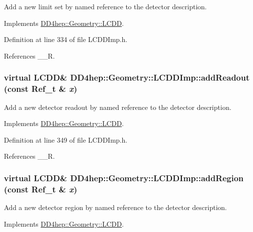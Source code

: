 Add a new limit set by named reference to the detector description. 

Implements \hyperlink{class_d_d4hep_1_1_geometry_1_1_l_c_d_d_af11d7a6aaeb91256f14d5892d84e2b30}{DD4hep::Geometry::LCDD}.

Definition at line 334 of file LCDDImp.h.

References \_\-\_\-R.\hypertarget{class_d_d4hep_1_1_geometry_1_1_l_c_d_d_imp_a876f792d25fd05a99646cd6c0df77d09}{
\subsubsection[{addReadout}]{\setlength{\rightskip}{0pt plus 5cm}virtual {\bf LCDD}\& DD4hep::Geometry::LCDDImp::addReadout (const {\bf Ref\_\-t} \& {\em x})}}
\label{class_d_d4hep_1_1_geometry_1_1_l_c_d_d_imp_a876f792d25fd05a99646cd6c0df77d09}


Add a new detector readout by named reference to the detector description. 

Implements \hyperlink{class_d_d4hep_1_1_geometry_1_1_l_c_d_d_a9823ad063bd9986e92e66c29f13e28f7}{DD4hep::Geometry::LCDD}.

Definition at line 349 of file LCDDImp.h.

References \_\-\_\-R.\hypertarget{class_d_d4hep_1_1_geometry_1_1_l_c_d_d_imp_a9b24c9ac8dde50f36fbeea3e6cb8d2cb}{
\subsubsection[{addRegion}]{\setlength{\rightskip}{0pt plus 5cm}virtual {\bf LCDD}\& DD4hep::Geometry::LCDDImp::addRegion (const {\bf Ref\_\-t} \& {\em x})}}
\label{class_d_d4hep_1_1_geometry_1_1_l_c_d_d_imp_a9b24c9ac8dde50f36fbeea3e6cb8d2cb}


Add a new detector region by named reference to the detector description. 

Implements \hyperlink{class_d_d4hep_1_1_geometry_1_1_l_c_d_d_a633c913dcf2a31b52976e5f5bd8a63e2}{DD4hep::Geometry::LCDD}.

